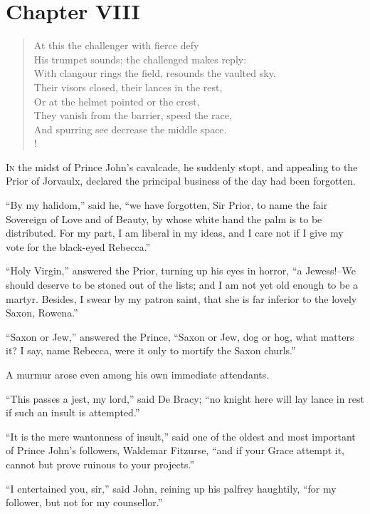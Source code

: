 \chapter{Chapter VIII}

\begin{verse}
At this the challenger with fierce defy\\
His trumpet sounds; the challenged makes reply:\\
With clangour rings the field, resounds the vaulted sky.\\
Their visors closed, their lances in the rest,\\
Or at the helmet pointed or the crest,\\
They vanish from the barrier, speed the race,\\
And spurring see decrease the middle space.\\!
\end{verse}

\lettrine{I}{n} the midst of Prince John's cavalcade, he suddenly stopt, and
appealing to the Prior of Jorvaulx, declared the principal business of
the day had been forgotten.

``By my halidom,'' said he, ``we have forgotten, Sir Prior, to name the
fair Sovereign of Love and of Beauty, by whose white hand the palm is to
be distributed. For my part, I am liberal in my ideas, and I care not if
I give my vote for the black-eyed Rebecca.''

``Holy Virgin,'' answered the Prior, turning up his eyes in horror, ``a
Jewess!--We should deserve to be stoned out of the lists; and I am not
yet old enough to be a martyr. Besides, I swear by my patron saint, that
she is far inferior to the lovely Saxon, Rowena.''

``Saxon or Jew,'' answered the Prince, ``Saxon or Jew, dog or hog, what
matters it? I say, name Rebecca, were it only to mortify the Saxon
churls.''

A murmur arose even among his own immediate attendants.

``This passes a jest, my lord,'' said De Bracy; ``no knight here will
lay lance in rest if such an insult is attempted.''

``It is the mere wantonness of insult,'' said one of the oldest and most
important of Prince John's followers, Waldemar Fitzurse, ``and if your
Grace attempt it, cannot but prove ruinous to your projects.''

``I entertained you, sir,'' said John, reining up his palfrey haughtily,
``for my follower, but not for my counsellor.''

